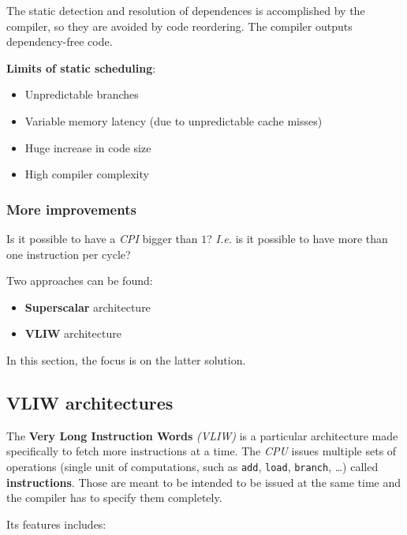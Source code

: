 \documentclass[english]{article}
\begin{document}
The static detection and resolution of dependences is accomplished by the compiler, so they are avoided by code reordering.
The compiler outputs dependency-free code.

\bigskip
\textbf{Limits of static scheduling}:
\begin{itemize}
  \item Unpredictable branches
  \item Variable memory latency (due to unpredictable cache misses)
  \item Huge increase in code size
  \item High compiler complexity
\end{itemize}

\subsubsection{More improvements}

Is it possible to have a \textit{CPI} bigger than \(1\)?
\textit{I.e.} is it possible to have more than one instruction per cycle?

Two approaches can be found:

\begin{itemize}
  \item \textbf{Superscalar} architecture
  \item \textbf{VLIW} architecture
\end{itemize}

In this section, the focus is on the latter solution.

\subsection{VLIW architectures}

The \textbf{Very Long Instruction Words} \textit{(VLIW)} is a particular architecture made specifically to fetch more instructions at a time.
The \textit{CPU} issues multiple sets of operations (single unit of computations, such as \texttt{add}, \texttt{load}, \texttt{branch}, \ldots) called \textbf{instructions}.
Those are meant to be intended to be issued at the same time and the compiler has to specify them completely.

\bigskip
Its features includes:
\end{document}
